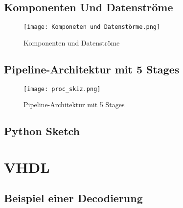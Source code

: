 \documentclass[paper=a4,fontsize=12pt,twocolumn]{scrreprt}
\begin{document}
\section{Komponenten Und Datenströme}
\label{sec:apx_komponenten_und_datenstroeme}

\begin{figure*}[h]
    \centering
    \texttt{[image: Komponeten und Datenstörme.png]}
    \caption{Komponenten und Datenströme}
    \label{fig:komponenten_und_datenstroeme}
\end{figure*}

\section{Pipeline-Architektur mit 5 Stages}
\label{sec:apx_pipeline_architektur_mit_5_stages}

\begin{figure*}
    \centering
    \texttt{[image: proc\_skiz.png]}
    \caption{Pipeline-Architektur mit 5 Stages \autocite[]{rsvorlesung}}
    \label{fig:pipeline_architektur_mit_5_stages}
\end{figure*}

\section{Python Sketch}
\label{sec:apx_python_sketch}



\chapter{VHDL}

\section{Beispiel einer Decodierung}
\label{sec:apx_beispiel_einer_decodierung}
\end{document}
